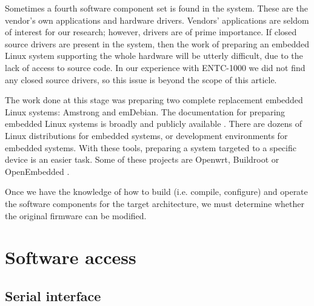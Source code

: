 \documentclass[conference]{IEEEtran}
\newcommand{\nota}[1]{}
\begin{document}
Sometimes a fourth software component set is found in the system. These are the vendor's own applications and hardware drivers. Vendors' applications are seldom of interest for our research; however, drivers are of prime importance. If closed source drivers are present in the system, then the work of preparing an embedded Linux system supporting the whole hardware will be utterly difficult, due to the lack of access to source code. In our experience with ENTC-1000 we did not find any closed source drivers, so this issue is beyond the scope of this article.
 
\nota{
El trabajo realizado en este punto fue la preparación
de dos sistemas Linux embebidos completos de reemplazo: Amstrong y emDebian.
La documentación para preparar sistemas Linux embebidos es amplia y públicamente
disponible (referencias). Además, existen decenas de
distribuciones Linux para embebidos,
o entornos de desarrollo de distribuciones Linux para embebidos 
\footnote{No confundir distribución con entorno de desarrollo}. Estas herramientas
facilitan la preparación de un sistema para un dispositivo específico.
Algunas de estos proyectos son Openwrt, Buildroot, u OpenEmbedded (referencias).

Una vez que se tiene el conocimiento en cómo construir (compilar y configurar)
y operar los componentes de software para la arquitectura destino, se
debe realizar un análisis de si es posible o no modificar el firmware original.
}

The work done at this stage was preparing two complete replacement embedded Linux systems: Amstrong and emDebian. The documentation for preparing embedded Linux systems is broadly and publicly available \cite{freeelectron, emb1, emb2}. There are dozens of Linux distributions for embedded systems, or development environments for embedded systems. With these tools, preparing a system targeted to a specific device is an easier task. Some of these projects are Openwrt, Buildroot or OpenEmbedded \cite{buildroot, openembedded, openwrt}.

Once we have the knowledge of how to build (i.e. compile, configure) and operate the software components for the target architecture, we must determine whether the original firmware can be modified.

\section{Software access}

\subsection{Serial interface}
\nota {
Existen varias posibilidades para conectarse a un dispositivo 
Linux embebido, pero una de las disponibles, mas comúnmente encontrada es
a través de una consola serial. En los sistemas Linux, la 
consola serial permite ver los mensajes de error del kernel,
y también interactuar con el gestor de arranque.
}
\end{document}
